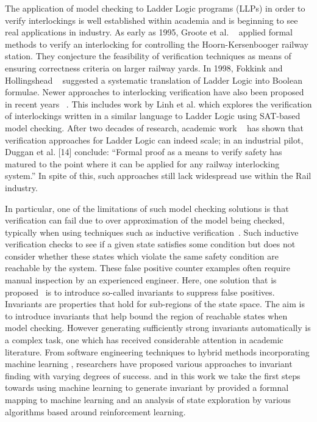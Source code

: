 \documentclass[conference,compsoc]{IEEEtran}
\begin{document}
The application of model checking
to Ladder Logic programs (LLPs) in order to verify interlockings is well established within
academia and is beginning to see real applications in industry.  As early as 1995, Groote
et al. ~\cite{groote1995safety} applied formal methods to verify an interlocking for controlling the Hoorn-Kersenbooger railway station. They conjecture the feasibility of verification techniques
as means of ensuring correctness criteria on larger railway yards. In 1998, Fokkink
and Hollingshead ~\cite{fokkink1998verification} suggested a systematic translation of Ladder Logic into Boolean
formulae. Newer approaches to interlocking verification have also been proposed in recent
years ~\cite{fantechi2012some, ferrari2011model, haxthausen2008modelling}. This includes work by Linh et al. which explores the verification
of interlockings written in a similar language to Ladder Logic using SAT-based model
checking. After two decades of research, academic work ~\cite{kanso2009automated, james2013verification} has shown that verification
approaches for Ladder Logic can indeed scale; in an industrial pilot, Duggan et al. [14] conclude: “Formal proof as a means to verify safety has matured to the point where it
can be applied for any railway interlocking system.” In spite of this, such approaches still lack widespread use within the Rail industry. 


In particular, one of the limitations of such model checking solutions is that verification can fail due to over approximation of the model being checked, typically when using techniques such as inductive verification~\cite{}. Such inductive verification checks to see if a given state satisfies some condition but does not consider whether these states which violate
the same safety condition are reachable by the system. These false positive  counter examples often require manual inspection by an
experienced engineer. Here, one solution that is proposed~\cite{1688959} is to introduce so-called invariants to suppress false positives. Invariants are properties that hold for sub-regions of the state space. The aim is to introduce invariants that help bound the region of reachable states when model checking. However generating sufficiently strong invariants automatically is a complex task, one which has received considerable attention in academic
literature. From software engineering techniques \cite{case2007automated, bensalem1996powerful} to hybrid methods incorporating machine learning \cite{garg2016learning}, researchers have proposed various approaches to invariant finding with varying degrees of success. and in this work we take the first steps towards using machine learning to generate invariant by provided a formnal mapping to machine learning and an analysis of state exploration by various algorithms based around reinforcement learning.
\end{document}
